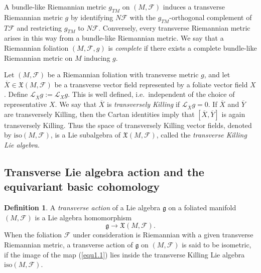\documentclass[reqno, 11pt]{amsart}
\theoremstyle{definition}
\newtheorem{defn}[thm]{Definition}
\theoremstyle{property}
\theoremstyle{remark}
\numberwithin{equation}{section}
\begin{document}
A bundle-like Riemannian metric $g_{TM}$ on $(M,\mathcal F)$ induces a transverse
Riemannian metric $g$ by identifying $N\mathcal F$ with the
$g_{TM}$-orthogonal complement of $T\mathcal F$ and restricting $g_{TM}$ to
$N\mathcal F$. Conversely, every transverse Riemannian metric arises in this way
from a bundle-like Riemannian metric. We say that a Riemannian foliation
$(M,\mathcal F,g)$ is \emph{complete} if there exists a complete bundle-like
Riemannian metric on $M$ inducing $g$.  


Let $(M,\mathcal{F})$ be a Riemannian foliation with transverse metric $g$, and let $\overline{X}\in \mathfrak{X}(M,\mathcal{F})$ be a transverse vector field represented by a foliate vector field $X$. Define
$\mathcal{L}_{\overline{X}}g:=\mathcal{L}_Xg$. This is well defined, i.e.\ independent of the choice of representative $X$. We say that $\overline{X}$ is \emph{transversely Killing} if $\mathcal{L}_{\overline{X}}g=0$. If $\overline{X}$ and $\overline{Y}$ are transversely Killing, then the Cartan identities imply that $[\overline{X},\overline{Y}]$ is again transversely Killing. Thus the space of transversely Killing vector fields, denoted by $\mathrm{iso}(M,\mathcal{F})$, is a Lie subalgebra of $\mathfrak{X}(M,\mathcal{F})$, called the \emph{transverse Killing Lie algebra}.


\subsection{Transverse Lie algebra action and the equivariant basic cohomology}

\begin{defn}\label{transverse-action}
A \emph{transverse action} of a Lie algebra $\mathfrak{g}$ on a foliated manifold $(M,\mathcal{F})$ is a Lie algebra homomorphism \begin{equation}\label{equ1.1}
\mathfrak{g}\rightarrow\mathfrak{X}(M, \mathcal{F}).  \end{equation}
When the foliation $\mathcal{F}$ under consideration is Riemannian with a given transverse Riemannian metric, a transverse action of $\mathfrak{g}$ on $(M,\mathcal{F})$ is said to be isometric, if the image of the map (\ref{equ1.1}) lies inside the transverse Killing Lie algebra $\mathrm{iso}(M, \mathcal{F})$.
\end{defn}
\end{document}
